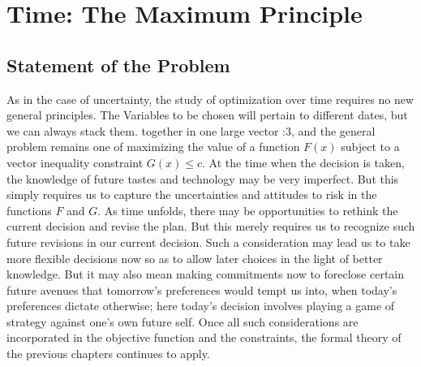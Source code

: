 \chapter{Time: The Maximum Principle}

\section*{Statement of the Problem}

As in the case of uncertainty, the study of optimization over time requires no new general principles. The Variables to be chosen will pertain to different dates, but we can always stack them. together in one large vector :3, and the general problem remains one of maximizing the value of a function $F(x)$ subject to a vector inequality constraint $G(x) \leq c$. At the time when the decision is taken, the knowledge of future tastes and technology may be very imperfect. But this simply requires us to capture the uncertainties and attitudes to risk in the functions $F$ and $G$. As time unfolds, there may be opportunities to rethink the current decision and revise the plan. But this merely requires us to recognize such future revisions in our current decision. Such a consideration may lead us to take more flexible decisions now so as to allow later choices in the light of better knowledge. But it may also mean making commitments now to foreclose certain future avenues that tomorrow's preferences would tempt us into, when today's preferences dictate otherwise; here today's decision involves playing a game of strategy against one's own future self. Once all such considerations are incorporated in the objective function and the constraints, the formal theory of the previous chapters continues to apply.

